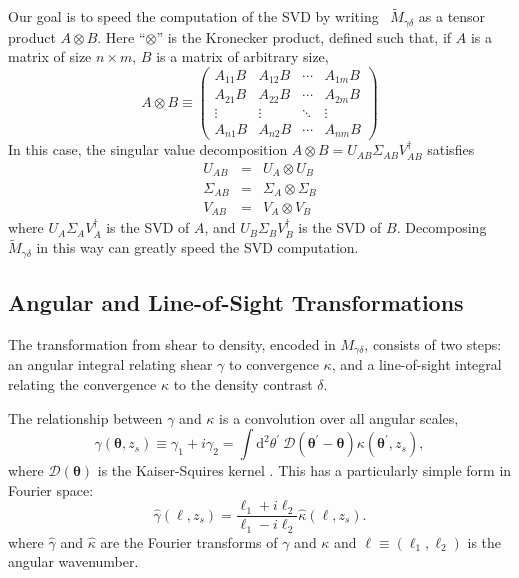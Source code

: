 \documentclass[twocolumn]{emulateapj}
\newcommand{\dd}{\mathrm{d}} %
\newcommand{\myvec}[1]{\boldsymbol{#1}}
\newcommand{\mymat}[1]{#1}
\begin{document}
Our goal is to speed the computation of the SVD by writing \
$\widetilde{M}_{\gamma\delta}$
as a tensor product $\mymat{A} \otimes \mymat{B}$.  Here ``$\otimes$''
is the Kronecker product, defined such that, if $\mymat{A}$ is a matrix
of size $n \times m$, $B$ is a matrix of arbitrary size,
\begin{equation}
  \mymat{A}\otimes\mymat{B} \equiv \left(
  \begin{array}{cccc}
    A_{11}B & A_{12}B & \cdots & A_{1m}B \\
    A_{21}B & A_{22}B & \cdots & A_{2m}B \\
    \vdots  & \vdots & \ddots & \vdots  \\
    A_{n1}B & A_{n2}B & \cdots & A_{nm}B 
  \end{array}\right)
\end{equation}
In this case, the singular value decomposition
$A\otimes B = U_{AB}\Sigma_{AB}V^\dagger_{AB}$
satisfies
\begin{eqnarray}
  \label{AB_SVD}
  U_{AB} &=& U_A\otimes U_B \nonumber\\
  \Sigma_{AB} &=& \Sigma_A \otimes \Sigma_B\nonumber\\
  V_{AB} &=& V_A \otimes V_B
\end{eqnarray}
where $U_A\Sigma_AV^\dagger_A$ is the SVD of $A$, 
and   $U_B\Sigma_BV^\dagger_B$ is the SVD of $B$.
Decomposing $\widetilde{M}_{\gamma\delta}$ in this way can 
greatly speed the SVD computation.

\subsection{Angular and Line-of-Sight Transformations}
The transformation from shear to density, encoded in $M_{\gamma\delta}$,
consists of two steps: an angular integral relating shear $\gamma$ to
convergence $\kappa$, and a line-of-sight integral relating the convergence
$\kappa$ to the density contrast $\delta$.

The relationship between $\gamma$ and $\kappa$ is a convolution over
all angular scales,
\begin{equation}
  \label{gamma_integral}
  \gamma(\myvec\theta,z_s) \equiv \gamma_1 + i\gamma_2 = \int \dd^2\theta^\prime
  \ \mathcal{D}(\myvec\theta^\prime-\myvec\theta)\kappa(\myvec\theta^\prime,z_s),
\end{equation}
where $\mathcal{D}(\myvec\theta)$ 
is the Kaiser-Squires kernel \citep{Kaiser93}.  
This has a particularly simple form in Fourier space:
\begin{equation}
  \label{gamma_fourier}
  \hat\gamma(\myvec\ell,z_s) 
  = \frac{\ell_1 + i\ell_2}{\ell_1 - i\ell_2}\hat\kappa(\myvec\ell,z_s).
\end{equation}
where $\hat\gamma$ and $\hat\kappa$ are the Fourier transforms of $\gamma$
and $\kappa$ and $\myvec{\ell}\equiv(\ell_1,\ell_2)$ is the angular wavenumber.
\end{document}
